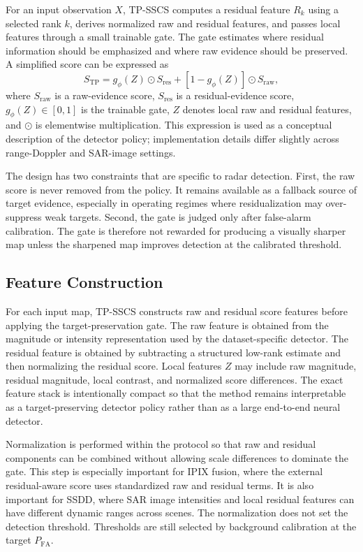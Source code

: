 \documentclass[journal]{IEEEtran}
\begin{document}
For an input observation $X$, TP-SSCS computes a residual feature $R_k$ using a selected rank $k$, derives normalized raw and residual features, and passes local features through a small trainable gate. The gate estimates where residual information should be emphasized and where raw evidence should be preserved. A simplified score can be expressed as
\begin{equation}
    S_{\mathrm{TP}} = g_\phi(Z) \odot S_{\mathrm{res}} +
    [1 - g_\phi(Z)] \odot S_{\mathrm{raw}},
\end{equation}
where $S_{\mathrm{raw}}$ is a raw-evidence score, $S_{\mathrm{res}}$ is a residual-evidence score, $g_\phi(Z) \in [0,1]$ is the trainable gate, $Z$ denotes local raw and residual features, and $\odot$ is elementwise multiplication. This expression is used as a conceptual description of the detector policy; implementation details differ slightly across range-Doppler and SAR-image settings.

The design has two constraints that are specific to radar detection. First, the raw score is never removed from the policy. It remains available as a fallback source of target evidence, especially in operating regimes where residualization may over-suppress weak targets. Second, the gate is judged only after false-alarm calibration. The gate is therefore not rewarded for producing a visually sharper map unless the sharpened map improves detection at the calibrated threshold.

\subsection{Feature Construction}

For each input map, TP-SSCS constructs raw and residual score features before applying the target-preservation gate. The raw feature is obtained from the magnitude or intensity representation used by the dataset-specific detector. The residual feature is obtained by subtracting a structured low-rank estimate and then normalizing the residual score. Local features $Z$ may include raw magnitude, residual magnitude, local contrast, and normalized score differences. The exact feature stack is intentionally compact so that the method remains interpretable as a target-preserving detector policy rather than as a large end-to-end neural detector.

Normalization is performed within the protocol so that raw and residual components can be combined without allowing scale differences to dominate the gate. This step is especially important for IPIX fusion, where the external residual-aware score uses standardized raw and residual terms. It is also important for SSDD, where SAR image intensities and local residual features can have different dynamic ranges across scenes. The normalization does not set the detection threshold. Thresholds are still selected by background calibration at the target $P_{\mathrm{FA}}$.
\end{document}
